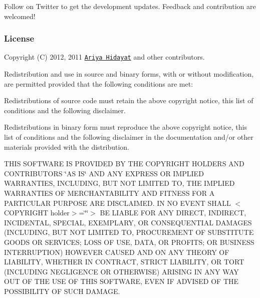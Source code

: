 Follow \href{http://twitter.com/Esprima}{\tt } on Twitter to get the development updates. Feedback and contribution are welcomed!

\subsubsection*{License}

Copyright (C) 2012, 2011 \href{http://ariya.ofilabs.com/about}{\tt Ariya Hidayat} and other contributors.

Redistribution and use in source and binary forms, with or without modification, are permitted provided that the following conditions are met\+:


\begin{DoxyItemize}
\item Redistributions of source code must retain the above copyright notice, this list of conditions and the following disclaimer.
\item Redistributions in binary form must reproduce the above copyright notice, this list of conditions and the following disclaimer in the documentation and/or other materials provided with the distribution.
\end{DoxyItemize}

T\+H\+IS S\+O\+F\+T\+W\+A\+RE IS P\+R\+O\+V\+I\+D\+ED BY T\+HE C\+O\+P\+Y\+R\+I\+G\+HT H\+O\+L\+D\+E\+RS A\+ND C\+O\+N\+T\+R\+I\+B\+U\+T\+O\+RS \char`\"{}\+A\+S I\+S\char`\"{} A\+ND A\+NY E\+X\+P\+R\+E\+SS OR I\+M\+P\+L\+I\+ED W\+A\+R\+R\+A\+N\+T\+I\+ES, I\+N\+C\+L\+U\+D\+I\+NG, B\+UT N\+OT L\+I\+M\+I\+T\+ED TO, T\+HE I\+M\+P\+L\+I\+ED W\+A\+R\+R\+A\+N\+T\+I\+ES OF M\+E\+R\+C\+H\+A\+N\+T\+A\+B\+I\+L\+I\+TY A\+ND F\+I\+T\+N\+E\+SS F\+OR A P\+A\+R\+T\+I\+C\+U\+L\+AR P\+U\+R\+P\+O\+SE A\+RE D\+I\+S\+C\+L\+A\+I\+M\+ED. IN NO E\+V\+E\+NT S\+H\+A\+LL $<$\+C\+O\+P\+Y\+R\+I\+G\+H\+T holder$>$=\char`\"{}\char`\"{}$>$ BE L\+I\+A\+B\+LE F\+OR A\+NY D\+I\+R\+E\+CT, I\+N\+D\+I\+R\+E\+CT, I\+N\+C\+I\+D\+E\+N\+T\+AL, S\+P\+E\+C\+I\+AL, E\+X\+E\+M\+P\+L\+A\+RY, OR C\+O\+N\+S\+E\+Q\+U\+E\+N\+T\+I\+AL D\+A\+M\+A\+G\+ES (I\+N\+C\+L\+U\+D\+I\+NG, B\+UT N\+OT L\+I\+M\+I\+T\+ED TO, P\+R\+O\+C\+U\+R\+E\+M\+E\+NT OF S\+U\+B\+S\+T\+I\+T\+U\+TE G\+O\+O\+DS OR S\+E\+R\+V\+I\+C\+ES; L\+O\+SS OF U\+SE, D\+A\+TA, OR P\+R\+O\+F\+I\+TS; OR B\+U\+S\+I\+N\+E\+SS I\+N\+T\+E\+R\+R\+U\+P\+T\+I\+ON) H\+O\+W\+E\+V\+ER C\+A\+U\+S\+ED A\+ND ON A\+NY T\+H\+E\+O\+RY OF L\+I\+A\+B\+I\+L\+I\+TY, W\+H\+E\+T\+H\+ER IN C\+O\+N\+T\+R\+A\+CT, S\+T\+R\+I\+CT L\+I\+A\+B\+I\+L\+I\+TY, OR T\+O\+RT (I\+N\+C\+L\+U\+D\+I\+NG N\+E\+G\+L\+I\+G\+E\+N\+CE OR O\+T\+H\+E\+R\+W\+I\+SE) A\+R\+I\+S\+I\+NG IN A\+NY W\+AY O\+UT OF T\+HE U\+SE OF T\+H\+IS S\+O\+F\+T\+W\+A\+RE, E\+V\+EN IF A\+D\+V\+I\+S\+ED OF T\+HE P\+O\+S\+S\+I\+B\+I\+L\+I\+TY OF S\+U\+CH D\+A\+M\+A\+GE. 
